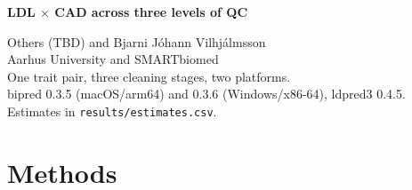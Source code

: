 \documentclass[11pt,a4paper]{article}
\begin{document}
{\LARGE\bfseries LDL $\times$ CAD across three levels of QC\par}
\medskip
{\small Others (TBD) and Bjarni J\'ohann Vilhj\'almsson\\
Aarhus University and SMARTbiomed\\[0.35em]
One trait pair, three cleaning stages, two platforms.\\
bipred 0.3.5 (macOS/arm64) and 0.3.6 (Windows/x86-64), ldpred3 0.4.5.\\
Estimates in \texttt{results/estimates.csv}.\par}
\bigskip





\section*{Methods}


\end{document}
